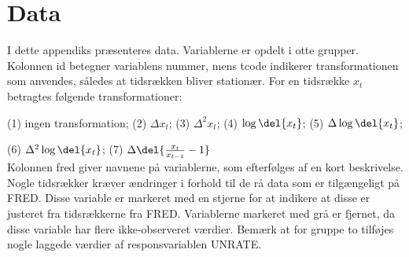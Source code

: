 \chapter{Data} \label{app:app_data}

I dette appendiks præsenteres data. 
Variablerne er opdelt i otte grupper.
Kolonnen id betegner variablens nummer, mens tcode indikerer transformationen som anvendes, således at tidsrækken bliver stationær. For en tidsrække $x_t$ betragtes følgende transformationer:

(1) ingen transformation; (2) \(\Delta x_t\); (3) \(\Delta^2 x_t\); (4) \(\log \del{x_t}\); (5) \(\Delta \log \del{x_t}\); 

(6) \(\Delta^2 \log \del{x_t}\); (7) \(\Delta \del{\frac{x_t}{x_{t-1}}-1}\) \\[2mm]
%
Kolonnen fred giver navnene på variablerne, som efterfølges af en kort beskrivelse.
Nogle tidsrækker kræver ændringer i forhold til de rå data som er tilgængeligt på FRED.
Disse variable er markeret med en stjerne for at indikere at disse er justeret fra tidsrækkerne fra FRED.
Variablerne markeret med grå er fjernet, da disse variable har flere ikke-observeret værdier.
Bemærk at for gruppe to tilføjes nogle laggede værdier af responsvariablen UNRATE.



%






